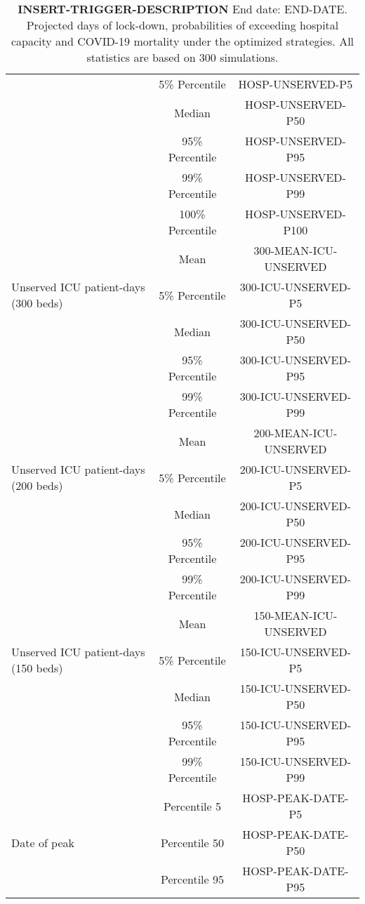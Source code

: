 \documentclass{article}
\begin{document}
\begin{table}[!htb]
\begin{tabular}{p{4cm}cc}
									& 5\% Percentile     & HOSP-UNSERVED-P5    \\ \cmidrule(l){2-3}
									& Median & HOSP-UNSERVED-P50  \\ \cmidrule(l){2-3}  
									& 95\% Percentile     & HOSP-UNSERVED-P95       \\ \cmidrule(l){2-3} 
									& 99\% Percentile     & HOSP-UNSERVED-P99         \\ \cmidrule(l){2-3} 
									& 100\% Percentile     & HOSP-UNSERVED-P100      \\   \midrule 
\multirow{3}{\hsize}{Unserved ICU patient-days (300 beds)} & Mean & 300-MEAN-ICU-UNSERVED  \\ \cmidrule(l){2-3}
									& 5\% Percentile     & 300-ICU-UNSERVED-P5    \\ \cmidrule(l){2-3} 
									& Median & 300-ICU-UNSERVED-P50  \\ \cmidrule(l){2-3} 
									& 95\% Percentile     & 300-ICU-UNSERVED-P95    \\ \cmidrule(l){2-3} 
									& 99\% Percentile     & 300-ICU-UNSERVED-P99   \\  \midrule  							
\multirow{3}{\hsize}{Unserved ICU patient-days (200 beds)} & Mean & 200-MEAN-ICU-UNSERVED  \\ \cmidrule(l){2-3}
& 5\% Percentile     & 200-ICU-UNSERVED-P5    \\ \cmidrule(l){2-3} 
& Median & 200-ICU-UNSERVED-P50  \\ \cmidrule(l){2-3} 
& 95\% Percentile     & 200-ICU-UNSERVED-P95    \\ \cmidrule(l){2-3} 
& 99\% Percentile     & 200-ICU-UNSERVED-P99          \\ \midrule
\multirow{3}{\hsize}{Unserved ICU patient-days (150 beds)} & Mean & 150-MEAN-ICU-UNSERVED  \\ \cmidrule(l){2-3}
& 5\% Percentile     & 150-ICU-UNSERVED-P5    \\ \cmidrule(l){2-3} 
& Median & 150-ICU-UNSERVED-P50  \\ \cmidrule(l){2-3} 
& 95\% Percentile     & 150-ICU-UNSERVED-P95    \\ \cmidrule(l){2-3} 
& 99\% Percentile     & 150-ICU-UNSERVED-P99    \\ \cmidrule(l){2-3} 		
\multirow{3}{\hsize}{Date of peak}   & Percentile 5      & HOSP-PEAK-DATE-P5   \\ \cmidrule(l){2-3} 
                                     & Percentile 50     & HOSP-PEAK-DATE-P50    \\ \cmidrule(l){2-3} 
                                     & Percentile 95     & HOSP-PEAK-DATE-P95     \\  \bottomrule
\end{tabular}
\caption{\textbf{INSERT-TRIGGER-DESCRIPTION}
	End date: END-DATE. Projected days of lock-down, probabilities of exceeding hospital capacity and COVID-19 mortality under the optimized strategies. All statistics are based on 300 simulations.}
\label{table:summary_table}
\end{table}
\end{document}
